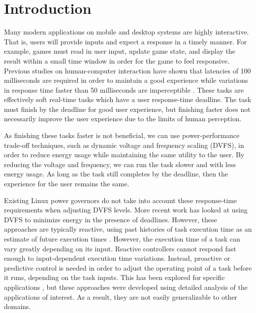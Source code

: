 \section{Introduction}
\label{sec:exec_time_prediction.introduction}

Many modern applications on mobile and desktop systems are highly interactive.
That is, users will provide inputs and expect a response in a timely manner.
For example, games must read in user input, update game state, and display the
result within a small time window in order for the game to feel responsive.
Previous studies on human-computer interaction have shown that latencies of 100
milliseconds are required in order to maintain a good experience
\cite{endo-osdi96, card-chi91, miller-afips68} while variations in response
time faster than 50 milliseconds are imperceptible \cite{lindgaard-bit06,
eqos-hpca15}. These tasks are effectively soft real-time tasks which have a
user response-time deadline. The task must finish by the deadline for good user
experience, but finishing faster does not necessarily improve the user
experience due to the limits of human perception.

As finishing these tasks faster is not beneficial, we can use power-performance
trade-off techniques, such as dynamic voltage and frequency scaling (DVFS), in
order to reduce energy usage while maintaining the same utility to the user. By
reducing the voltage and frequency, we can run the task slower and with less
energy usage. As long as the task still completes by the deadline, then the
experience for the user remains the same. 

Existing Linux power governors \cite{linux_governors} do not take into account
these response-time requirements when adjusting DVFS levels. More recent work
has looked at using DVFS to minimize energy in the presence of deadlines.
However, these approaches are typically reactive, using past histories of task
execution time as an estimate of future execution times \cite{gu-dac08,
choi-iccad02, pegasus-isca14, nachiappan-hpca15}.  However, the execution time
of a task can vary greatly depending on its input.  Reactive controllers cannot
respond fast enough to input-dependent execution time variations.  Instead,
proactive or predictive control is needed in order to adjust the operating
point of a task before it runs, depending on the task inputs. This has been
explored for specific applications \cite{gu-rtas08, zhu-hpca13, eqos-hpca15,
adrenaline-hpca15}, but these approaches were developed using detailed analysis
of the applications of interest. As a result, they are not easily generalizable
to other domains.

